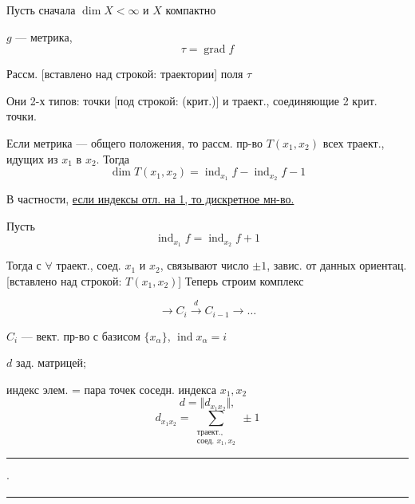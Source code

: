 Пусть сначала $\dim X<\infty$ и $X$ компактно

$g$ — метрика,
\begin{equation*}
\tau=\operatorname{grad}f
\end{equation*}

Рассм. 
[вставлено над строкой: траектории] поля $\tau$

Они 2-х типов: точки [под строкой: (крит.)] и траект., соединяющие 2 крит. точки.

Если метрика — общего положения, то рассм. пр-во $T(x_1,x_2)$
всех траект., идущих из $x_1$ в $x_2$. Тогда
\begin{equation*}
\dim T(x_1,x_2)=\operatorname{ind}_{x_1}f-\operatorname{ind}_{x_2}f-1
\tag{1}
\end{equation*}

В частности, \underline{если индексы отл. на 1, то дискретное мн-во.}

Пусть
\begin{equation*}
\operatorname{ind}_{x_1}f=\operatorname{ind}_{x_2}f+1
\tag{2}
\end{equation*}

Тогда с $\forall$ траект., соед. $x_1$ и $x_2$, связывают число $\pm1$,
завис. от данных ориентац.
[вставлено над строкой: $T(x_1,x_2)$] Теперь строим комплекс


\begin{equation*}
\longrightarrow C_i\overset{d}{\longrightarrow}C_{i-1}\longrightarrow\ldots
\tag{3}
\end{equation*}

$C_i$ — вект. пр-во с базисом $\{x_\alpha\}$, $\operatorname{ind}x_\alpha=i$

$d$ зад. матрицей;

индекс элем. = пара точек соседн. индекса $x_1,x_2$
\begin{equation*}
d=\Vert d_{x_1x_2}\Vert,
\end{equation*}
\begin{equation*}
d_{x_1x_2}=\sum_{\substack{\text{траект.,}\\\text{соед. }x_1,x_2}}\pm1
\tag{4}
\end{equation*}

\begin{center}
\rule{12mm}{0.4pt}\quad$\cdot$\quad\rule{12mm}{0.4pt}
\end{center}


